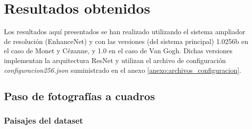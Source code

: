 \documentclass[[../main.tex]{subfiles}
\begin{document}
\section{Resultados obtenidos}

Los resultados aquí presentados se han realizado utilizando el sistema ampliador de resolución (EnhanceNet) y con las versiones (del sistema principal) 1.0\textunderscore 256b en el caso de Monet y Cézanne, y 1.0 en el caso de Van Gogh. Dichas versiones implementan la arquitectura ResNet y utilizan el archivo de configuración \textit{configuracion\textunderscore 256.json} suministrado en el anexo \ref{anexo:archivos_configuracion}.

\subsection{Paso de fotografías a cuadros}
\subsubsection{Paisajes del dataset}
\end{document}
